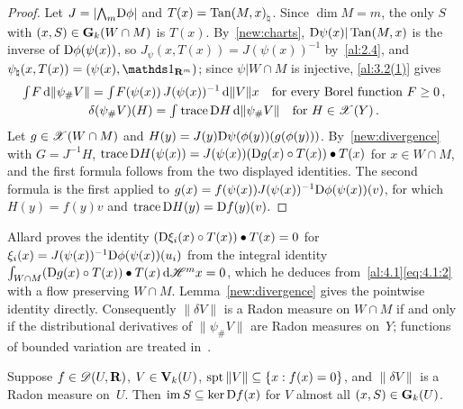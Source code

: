 \begin{proof}
    Let $J = |{\textstyle\boldsymbol{\bigwedge}}_{{m}} \mathrm{D} \phi|$ and $T(x) = {\operatorname{Tan}(M,x)}_\natural$. Since $\dim M = m$, the
    only $S$ with $(x,S) \in \mathbf{G}_{k}(W \cap M)$ is $T(x)$. By~\ref{new:charts}, $\mathrm{D} \psi(x) |
    \operatorname{Tan}(M,x)$ is the inverse of $\mathrm{D} \phi(\psi(x))$, so $J_\psi(x,T(x)) = J(\psi(x))^{-1}$
    by~\ref{al:2.4}, and $\psi_\natural(x,T(x)) = (\psi(x), \id{\R^m})$; since $\psi | W \cap M$
    is injective, \ref{al:3.2(1)} gives
    \begin{gather*}
        {\textstyle\int_{}^{}} F \,\mathrm{d} \|\psi_\# V\| = {\textstyle\int_{}^{}} F(\psi(x)) \, J(\psi(x))^{-1} \,\mathrm{d} \|V\| x
        \quad \text{for every Borel function $F \ge 0$} \,, \\
        \delta(\psi_\# V)(H) = {\textstyle\int_{}^{}} \operatorname{trace} \mathrm{D} H \,\mathrm{d} \|\psi_\# V\| \quad \text{for $H \in
        \mathscr{X}(Y)$} \,.
    \end{gather*} Let $g \in \mathscr{X}(W \cap M)$ and $H(y) = J(y) \mathrm{D} \psi(\phi(y))(g(\phi(y)))$.
    By~\ref{new:divergence} with $G = J^{-1} H$, $\operatorname{trace} \mathrm{D} H(\psi(x)) = J(\psi(x)) (\mathrm{D} g(x)
    \circ T(x)) \bullet T(x)$ for $x \in W \cap M$, and the first formula follows from the two
    displayed identities. The second formula is the first applied to $g(x) = f(\psi(x))
    J(\psi(x))^{-1} \mathrm{D} \phi(\psi(x))(v)$, for which $H(y) = f(y) v$ and $\operatorname{trace} \mathrm{D} H(y) = \mathrm{D}
    f(y)(v)$.
\end{proof}

\begin{remark}
    \label{rem:4.5}
    Allard proves the identity $(\mathrm{D} \xi_i(x) \circ T(x)) \bullet T(x) = 0$ for $\xi_i(x) =
    J(\psi(x))^{-1} \mathrm{D} \phi(\psi(x))(u_i)$ from the integral identity ${\textstyle\int_{W \cap M}^{}} (\mathrm{D}
    g(x) \circ T(x)) \bullet T(x) \,\mathrm{d} \mathscr{H}^m x = 0$, which he deduces from~\ref{al:4.1}\eqref{eq:4.1:2}
    with a flow preserving $W \cap M$. Lemma~\ref{new:divergence} gives the pointwise identity
    directly. Consequently $\|\delta V\|$ is a Radon measure on $W \cap M$ if and only if the
    distributional derivatives of $\|\psi_\# V\|$ are Radon measures on~$Y$; functions of bounded
    variation are treated in~\cite[4.5]{Federer1969}.
\end{remark}

\begin{lemma}
    \label{al:4.6(1)}
    Suppose $f \in \mathscr{D}(U,\mathbf{R})$, $V \in \mathbf{V}_{k}(U)$, $\operatorname{spt} \|V\| \subseteq \{ x : f(x) = 0
    \}$, and $\|\delta V\|$ is a Radon measure on~$U$. Then $\operatorname{im} S \subseteq \ker \mathrm{D} f(x)$ for
    $V$ almost all $(x,S) \in \mathbf{G}_{k}(U)$.
\end{lemma}

